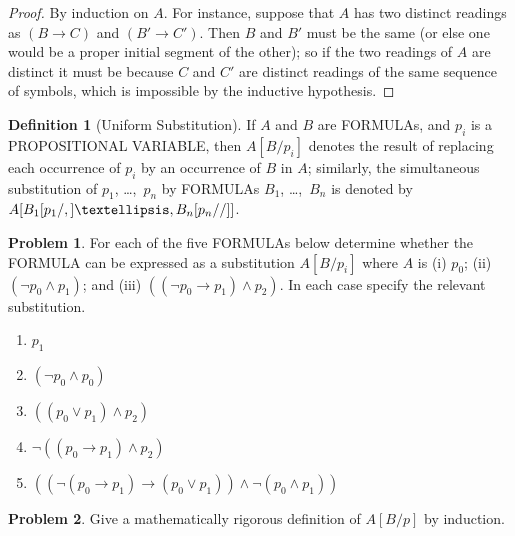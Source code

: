 \documentclass[10pt,a4paper]{article}
\newcommand*{\olup}[1]{\MakeUppercase{#1}}
\theoremstyle{plain}
\theoremstyle{definition}
\newtheorem{defn}[thm]{Definition}
\newtheorem{prob}{Problem}[section]
\theoremstyle{remark}
\providecommand{\lif}{\mathbin{\rightarrow}}
\providecommand{\Subst}[3]{#1[#2/#3]}
\providecommand{\Obj}{}
\providecommand{\SSubst}[3]{#1[#2/#3]}
\providecommand{\subst}[3]{#1[#2/#3]}
\begin{document}
\begin{proof}
By induction on $A$. For instance, suppose that $A$ has two distinct
readings as $(B \lif C)$ and $(B' \lif C')$. Then $B$ and $B'$
must be the same (or else one would be a proper initial segment of the
other); so if the two readings of $A$ are distinct it must be because
$C$ and $C'$ are distinct readings of the same sequence of symbols,
which is impossible by the inductive hypothesis.
\end{proof}


\begin{defn}[Uniform Substitution]
If $A$ and $B$ are \olup{formula}s, and $\Obj p_i$ is a \olup{propositional
variable}, then $\Subst{A}{B}{\Obj p_i}$ denotes the result of
replacing each occurrence of $\Obj p_i$ by an occurrence of $B$ in $A$;
similarly, the simultaneous substitution of $\Obj p_1$, \dots,~$\Obj p_n$ by
\olup{formula}s $B_1$, \dots,~$B_n$ is denoted by
$\SSubst{A}{\subst{B_1}{\Obj p_1},\dots,\subst{B_n}{\Obj p_n}}$.
\end{defn}

\begin{prob} For each of the five \olup{formula}s below determine whether the 
 \olup{formula} can be expressed as a substitution \( \Subst{A}{B}{\Obj p_i} \)
 where \( A \) is (i) \( \Obj p_0 \); (ii) \( ( \lnot \Obj p_0 \land \Obj
 p_1) \); and (iii) \( ( ( \lnot \Obj p_0 \lif \Obj p_1 ) \land \Obj
 p_2 ) \). In each case specify the relevant substitution.
  \begin{enumerate}
    \item \( \Obj p_1 \) 
    \item \( ( \lnot \Obj p_0 \land \Obj p_0 ) \)
    \item \( ( ( \Obj p_0 \lor \Obj p_1 ) \land \Obj p_2 )  \)
    \item \( \lnot ( ( \Obj p_0 \lif \Obj p_1 ) \land \Obj p_2 ) \)
    \item \( (( \lnot ( \Obj p_0 \lif \Obj p_1 ) \lif ( \Obj p_0 \lor \Obj p_1 )) \land \lnot ( \Obj p_0 \land \Obj p_1 )) \)
  \end{enumerate}
\end{prob}

\begin{prob}
Give a mathematically rigorous definition of $\Subst{A}{B}{p}$ by
induction.
\end{prob}



\end{document}
